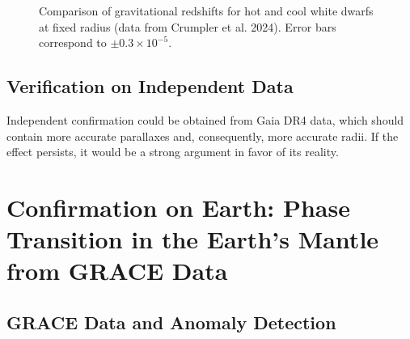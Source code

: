 \documentclass[12pt]{article}
\theoremstyle{remark}
\begin{document}
	\begin{figure}[htbp]
		\centering
		\caption{Comparison of gravitational redshifts for hot and cool white dwarfs at fixed radius (data from Crumpler et al. 2024). Error bars correspond to $\pm0.3\times10^{-5}$.}
		\label{fig:wd-redshift}
	\end{figure}
	
	\subsection{Verification on Independent Data}
	\label{subsec:wd-verification}
	
	Independent confirmation could be obtained from Gaia DR4 data, which should contain more accurate parallaxes and, consequently, more accurate radii. If the effect persists, it would be a strong argument in favor of its reality.
	
	\section{Confirmation on Earth: Phase Transition in the Earth's Mantle from GRACE Data}
	\label{sec:grace}
	
	\subsection{GRACE Data and Anomaly Detection}
	\label{subsec:grace-data}
	
\end{document}
